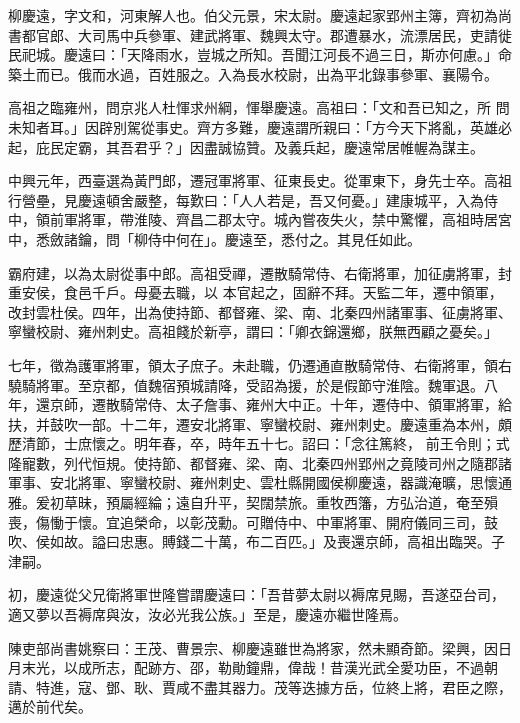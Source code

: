 \begin{pinyinscope}
 柳慶遠，字文和，河東解人也。伯父元景，宋太尉。慶遠起家郢州主簿，齊初為尚書都官郎、大司馬中兵參軍、建武將軍、魏興太守。郡遭暴水，流漂居民，吏請徙民祀城。慶遠曰：「天降雨水，豈城之所知。吾聞江河長不過三日，斯亦何慮。」命築土而已。俄而水過，百姓服之。入為長水校尉，出為平北錄事參軍、襄陽令。



 高祖之臨雍州，問京兆人杜惲求州綱，惲舉慶遠。高祖曰：「文和吾已知之，所
 問未知者耳。」因辟別駕從事史。齊方多難，慶遠謂所親曰：「方今天下將亂，英雄必起，庇民定霸，其吾君乎？」因盡誠協贊。及義兵起，慶遠常居帷幄為謀主。



 中興元年，西臺選為黃門郎，遷冠軍將軍、征東長史。從軍東下，身先士卒。高祖行營壘，見慶遠頓舍嚴整，每歎曰：「人人若是，吾又何憂。」建康城平，入為侍中，領前軍將軍，帶淮陵、齊昌二郡太守。城內嘗夜失火，禁中驚懼，高祖時居宮中，悉斂諸鑰，問「柳侍中何在」。慶遠至，悉付之。其見任如此。



 霸府建，以為太尉從事中郎。高祖受禪，遷散騎常侍、右衛將軍，加征虜將軍，封重安侯，食邑千戶。母憂去職，以
 本官起之，固辭不拜。天監二年，遷中領軍，改封雲杜侯。四年，出為使持節、都督雍、梁、南、北秦四州諸軍事、征虜將軍、寧蠻校尉、雍州刺史。高祖餞於新亭，謂曰：「卿衣錦還鄉，朕無西顧之憂矣。」



 七年，徵為護軍將軍，領太子庶子。未赴職，仍遷通直散騎常侍、右衛將軍，領右驍騎將軍。至京都，值魏宿預城請降，受詔為援，於是假節守淮陰。魏軍退。八年，還京師，遷散騎常侍、太子詹事、雍州大中正。十年，遷侍中、領軍將軍，給扶，并鼓吹一部。十二年，遷安北將軍、寧蠻校尉、雍州刺史。慶遠重為本州，頗歷清節，士庶懷之。明年春，卒，時年五十七。詔曰：「念往篤終，
 前王令則；式隆寵數，列代恒規。使持節、都督雍、梁、南、北秦四州郢州之竟陵司州之隨郡諸軍事、安北將軍、寧蠻校尉、雍州刺史、雲杜縣開國侯柳慶遠，器識淹曠，思懷通雅。爰初草昧，預屬經綸；遠自升平，契闊禁旅。重牧西籓，方弘治道，奄至殞喪，傷慟于懷。宜追榮命，以彰茂勳。可贈侍中、中軍將軍、開府儀同三司，鼓吹、侯如故。謚曰忠惠。賻錢二十萬，布二百匹。」及喪還京師，高祖出臨哭。子津嗣。



 初，慶遠從父兄衛將軍世隆嘗謂慶遠曰：「吾昔夢太尉以褥席見賜，吾遂亞台司，適又夢以吾褥席與汝，汝必光我公族。」至是，慶遠亦繼世隆焉。



 陳吏部尚書姚察曰：王茂、曹景宗、柳慶遠雖世為將家，然未顯奇節。梁興，因日月末光，以成所志，配跡方、邵，勒勛鐘鼎，偉哉！昔漢光武全愛功臣，不過朝請、特進，寇、鄧、耿、賈咸不盡其器力。茂等迭據方岳，位終上將，君臣之際，邁於前代矣。



\end{pinyinscope}